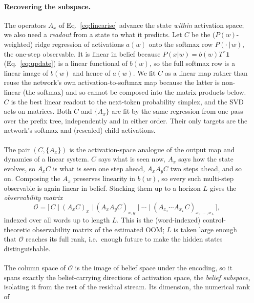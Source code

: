 \documentclass[11pt]{article}
\begin{document}
\paragraph{Recovering the subspace.}
The operators $A_x$ of Eq.~\eqref{eq:linearise} advance the state \emph{within}
activation space; we also need a \emph{readout} from a state to what it predicts. Let $C$ 
be the ($P(w)$-weighted) ridge regression of activations $a(w)$ onto the softmax row $P(\cdot\,|\,w)$, 
the one-step observable. It is linear in belief because $P(x|w)=b(w)T^x\mathbf{1}$ (Eq.~\eqref{eq:update}) 
is a linear functional of $b(w)$, so the full softmax row is a linear image of $b(w)$ and hence of $a(w)$. 
We fit $C$ as a linear map rather than reuse the network's own activation-to-softmax map because 
the latter is non-linear (the softmax) and so cannot be composed into the matrix products below. 
$C$ is the best linear readout to the next-token probability simplex, and the SVD acts on matrices. 
Both $C$ and $\{A_x\}$ are fit by the same regression from one pass over the prefix tree, 
independently and in either order. Their only targets are the network's softmax and (rescaled) child
activations.
\\\\
The pair $(C,\{A_x\})$ is the activation-space analogue of the output map and dynamics of
a linear system. $C$ says what is seen now, $A_x$ says how the state evolves, so $A_x C$
is what is seen one step ahead, $A_x A_y C$ two steps ahead, and so on. Composing the
$A_x$ preserves linearity in $b(w)$, so every such multi-step observable is again linear
in belief. Stacking them up to a horizon $L$ gives the \emph{observability matrix}
\begin{equation}
\mathcal{O}=\big[\,C \;\big|\; (A_x C)_{x} \;\big|\; (A_x A_y C)_{x,y}
\;\big|\;\cdots\;\big|\;(A_{x_1}\!\cdots A_{x_L} C)_{x_1,\dots,x_L}\,\big],
\label{eq:obsmat}
\end{equation}
indexed over all words up to length $L$. This is the (word-indexed)
control-theoretic observability matrix of the estimated OOM; $L$ is taken large enough
that $\mathcal{O}$ reaches its full rank, i.e.\ enough future to make the hidden states
distinguishable.
\\\\
The column space of $\mathcal{O}$ is the image of belief space under the encoding, so it
spans exactly the belief-carrying directions of activation space, the \emph{belief subspace},
isolating it from the rest of the residual stream. Its dimension, the numerical rank of 
\end{document}
